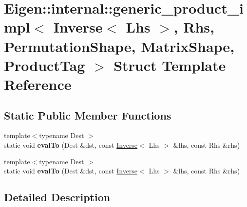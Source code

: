 \hypertarget{struct_eigen_1_1internal_1_1generic__product__impl_3_01_inverse_3_01_lhs_01_4_00_01_rhs_00_01_pec7dcfbcd610060a544651ed47d5cce0c}{}\section{Eigen\+:\+:internal\+:\+:generic\+\_\+product\+\_\+impl$<$ Inverse$<$ Lhs $>$, Rhs, Permutation\+Shape, Matrix\+Shape, Product\+Tag $>$ Struct Template Reference}
\label{struct_eigen_1_1internal_1_1generic__product__impl_3_01_inverse_3_01_lhs_01_4_00_01_rhs_00_01_pec7dcfbcd610060a544651ed47d5cce0c}
\subsection*{Static Public Member Functions}
\begin{DoxyCompactItemize}
\item 
\mbox{\label{struct_eigen_1_1internal_1_1generic__product__impl_3_01_inverse_3_01_lhs_01_4_00_01_rhs_00_01_pec7dcfbcd610060a544651ed47d5cce0c_a57d6e298e8720d837bedeeb25780b7a7}} 
{\footnotesize template$<$typename Dest $>$ }\\static void {\bfseries eval\+To} (Dest \&dst, const \hyperlink{class_eigen_1_1_inverse}{Inverse}$<$ Lhs $>$ \&lhs, const Rhs \&rhs)
\item 
\mbox{\label{struct_eigen_1_1internal_1_1generic__product__impl_3_01_inverse_3_01_lhs_01_4_00_01_rhs_00_01_pec7dcfbcd610060a544651ed47d5cce0c_a57d6e298e8720d837bedeeb25780b7a7}} 
{\footnotesize template$<$typename Dest $>$ }\\static void {\bfseries eval\+To} (Dest \&dst, const \hyperlink{class_eigen_1_1_inverse}{Inverse}$<$ Lhs $>$ \&lhs, const Rhs \&rhs)
\end{DoxyCompactItemize}


\subsection{Detailed Description}

